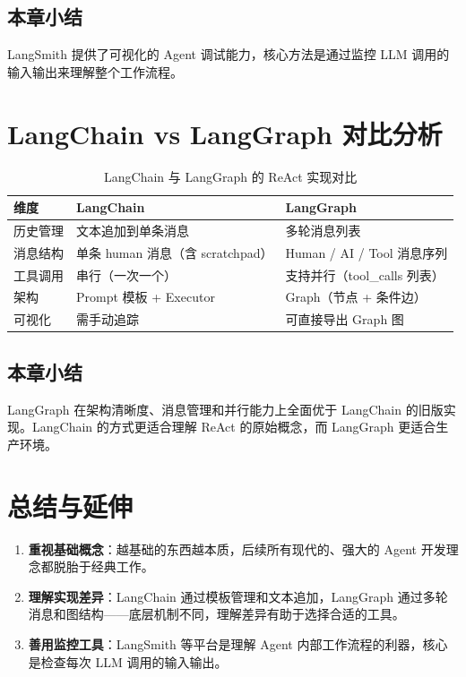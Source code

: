 \documentclass[a4paper]{article}
\begin{document}
\subsection{本章小结}
LangSmith 提供了可视化的 Agent 调试能力，核心方法是通过监控 LLM 调用的输入输出来理解整个工作流程。

\section{LangChain vs LangGraph 对比分析}

\begin{table}[H]
\centering
\begin{tabular}{lll}
\toprule
\textbf{维度} & \textbf{LangChain} & \textbf{LangGraph} \\
\midrule
历史管理 & 文本追加到单条消息 & 多轮消息列表 \\
消息结构 & 单条 human 消息（含 scratchpad） & Human / AI / Tool 消息序列 \\
工具调用 & 串行（一次一个） & 支持并行（tool\_calls 列表） \\
架构 & Prompt 模板 + Executor & Graph（节点 + 条件边） \\
可视化 & 需手动追踪 & 可直接导出 Graph 图 \\
\bottomrule
\end{tabular}
\caption{LangChain 与 LangGraph 的 ReAct 实现对比}
\end{table}

\subsection{本章小结}
LangGraph 在架构清晰度、消息管理和并行能力上全面优于 LangChain 的旧版实现。LangChain 的方式更适合理解 ReAct 的原始概念，而 LangGraph 更适合生产环境。

\section{总结与延伸}

\begin{enumerate}
    \item \textbf{重视基础概念}：越基础的东西越本质，后续所有现代的、强大的 Agent 开发理念都脱胎于经典工作。
    \item \textbf{理解实现差异}：LangChain 通过模板管理和文本追加，LangGraph 通过多轮消息和图结构——底层机制不同，理解差异有助于选择合适的工具。
    \item \textbf{善用监控工具}：LangSmith 等平台是理解 Agent 内部工作流程的利器，核心是检查每次 LLM 调用的输入输出。
\end{enumerate}
\end{document}
